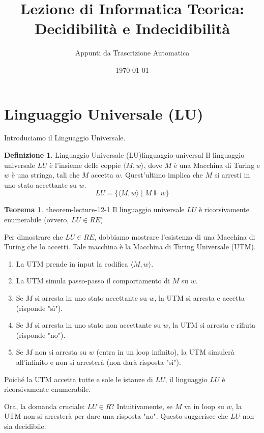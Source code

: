 \documentclass[a4paper]{article}
\title{Lezione di Informatica Teorica: Decidibilità e Indecidibilità}
\author{Appunti da Trascrizione Automatica}
\date{\today}
\makeatletter
\theoremstyle{definition} %
\newtheorem{theorem}{Teorema}
[section] %
\newtheorem{definition}{Definizione}[section] %
\renewenvironment{proof}[1][\proofname]{\par
  \pushQED{\qed}%
  \normalfont \topsep6\p@\@plus6\p@\relax
  \trivlist
  \item[\hskip\labelsep
        \bfseries
    #1\@addpunct{.}]\ignorespaces
}{%
  \popQED\endtrivlist\@endpefalse
}
\makeatother
\begin{document}
\maketitle
\tableofcontents
\newpage

\section{Linguaggio Universale (LU)}

Introduciamo il Linguaggio Universale.
\begin{definition}{Linguaggio Universale (LU)}{linguaggio-universal}
Il linguaggio universale $LU$ è l'insieme delle coppie $\langle M, w \rangle$, dove $M$ è una Macchina di Turing e $w$ è una stringa, tali che $M$ accetta $w$. Quest'ultimo implica che $M$ si arresti in uno stato accettante su $w$.
\[ LU = \{ \langle M, w \rangle \mid M \Vdash w \} \]
\end{definition}

\begin{theorem}{}{{ theorem-lecture-12-1 }}
Il linguaggio universale $LU$ è ricorsivamente enumerabile (ovvero, $LU \in RE$).
\end{theorem}
\begin{proof}
Per dimostrare che $LU \in RE$, dobbiamo mostrare l'esistenza di una Macchina di Turing che lo accetti. Tale macchina è la Macchina di Turing Universale (UTM).
\begin{enumerate}
    \item La UTM prende in input la codifica $\langle M, w \rangle$.
    \item La UTM simula passo-passo il comportamento di $M$ su $w$.
    \item Se $M$ si arresta in uno stato accettante su $w$, la UTM si arresta e accetta (risponde "sì").
    \item Se $M$ si arresta in uno stato non accettante su $w$, la UTM si arresta e rifiuta (risponde "no").
    \item Se $M$ non si arresta su $w$ (entra in un loop infinito), la UTM simulerà all'infinito e non si arresterà (non darà risposta "sì").
\end{enumerate}
Poiché la UTM accetta tutte e sole le istanze di $LU$, il linguaggio $LU$ è ricorsivamente enumerabile.
\end{proof}

Ora, la domanda cruciale: $LU \in R$? Intuitivamente, se $M$ va in loop su $w$, la UTM non si arresterà per dare una risposta "no". Questo suggerisce che $LU$ non sia decidibile.
\end{document}
